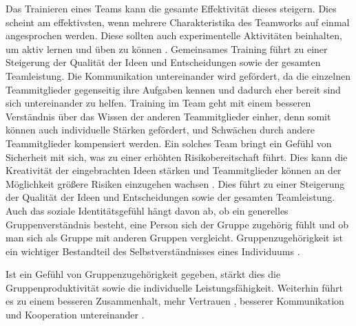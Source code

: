 \documentclass[a4paper,11pt]{article}%
\renewcommand{\\}{\vspace*{0.5\baselineskip} \newline}
\begin{document}
Das Trainieren eines Teams kann die gesamte Effektivität dieses steigern. Dies scheint am effektivsten, wenn mehrere Charakteristika des Teamworks auf einmal angesprochen werden. Diese sollten auch experimentelle Aktivitäten beinhalten, um aktiv lernen und üben zu können \citep[19]{mcewan2017effectiveness}.
Gemeinsames Training führt zu einer Steigerung der Qualität der Ideen und Entscheidungen sowie der gesamten Teamleistung.
Die Kommunikation untereinander wird gefördert, da die einzelnen Teammitglieder gegenseitig ihre Aufgaben kennen und dadurch eher bereit sind sich untereinander zu helfen.
Training im Team geht mit einem besseren Verständnis über das Wissen der anderen Teammitglieder einher, denn somit können auch individuelle Stärken gefördert, und Schwächen durch andere Teammitglieder kompensiert werden.
Ein solches Team bringt ein Gefühl von Sicherheit mit sich, was zu einer erhöhten Risikobereitschaft führt. Dies kann die Kreativität der eingebrachten Ideen stärken und Teammitglieder können an der Möglichkeit größere Risiken einzugehen wachsen \citep[p. 2-4]{biech2007pfeiffer}.
Dies führt zu einer Steigerung der Qualität der Ideen und Entscheidungen sowie der gesamten Teamleistung.
Auch das soziale Identitätsgefühl hängt davon ab, ob ein generelles Gruppenverständnis besteht, eine Person sich der Gruppe zugehörig fühlt und ob man sich als Gruppe mit anderen Gruppen vergleicht. Gruppenzugehörigkeit ist ein wichtiger Bestandteil des Selbstverständnisses eines Individuums \citep{sutantovicious}.
	
Ist ein Gefühl von Gruppenzugehörigkeit gegeben, stärkt dies die Gruppenproduktivität sowie die individuelle Leistungsfähigkeit. Weiterhin führt es zu einem besseren Zusammenhalt, mehr Vertrauen \citep{herbsleb2000distance}, besserer Kommunikation und Kooperation untereinander \citep[p. 510]{olson2003psychological}.
\end{document}
